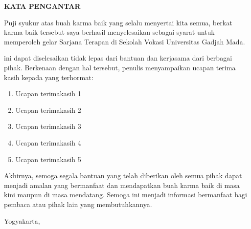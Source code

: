 \clearpage
{}
{}
\begin{center}
    \textbf{\large KATA PENGANTAR}\\[3em]
\end{center}


Puji syukur atas buah karma baik yang selalu menyertai kita semua, berkat karma baik tersebut saya berhasil menyelesaikan {\tipe} sebagai syarat untuk memperoleh gelar Sarjana Terapan di Sekolah Vokasi Universitas Gadjah Mada.

{\tipe} ini dapat diselesaikan tidak lepas dari bantuan dan kerjasama dari berbagai pihak. Berkenaan dengan hal tersebut, penulis menyampaikan ucapan terima kasih kepada yang terhormat:

\begin{enumerate}
    \item Ucapan terimakasih 1
    \item Ucapan terimakasih 2
    \item Ucapan terimakasih 3
    \item Ucapan terimakasih 4
    \item Ucapan terimakasih 5
\end{enumerate}

Akhirnya, semoga segala bantuan yang telah diberikan oleh semua pihak dapat menjadi amalan yang bermanfaat dan mendapatkan buah karma baik di masa kini maupun di masa mendatang. Semoga {\tipe} ini menjadi informasi bermanfaat bagi pembaca atau pihak lain yang membutuhkannya.

\begin{flushright}
    Yogyakarta, \tglpengesahan\\[1.25cm]
    {\underline{{\penulis}}} \\
    \nim
\end{flushright}